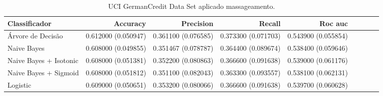 \begin{table}
\centering
\caption{UCI GermanCredit Data Set aplicado massageamento.}
\label{Aplicado massageamento 1}
\begin{tabular}{lrrrrrrrl}
\toprule
Classificador            &         Accuracy       &        Precision       &  Recall              &  Roc auc  \\
\midrule
Árvore de Decisão        &   0.612000 (0.050947) & 0.361100 (0.076585) &  0.373300 (0.071703) &  0.543900 (0.055854) \\ 
Naive Bayes              &   0.608000 (0.049855) & 0.351467 (0.078787) &  0.364400 (0.089674) &  0.538400 (0.059646) \\ 
Naive Bayes + Isotonic   &   0.608000 (0.051381) & 0.352200 (0.080863) &  0.366600 (0.091638) &  0.539000 (0.061176) \\ 
Naive Bayes + Sigmoid    &   0.608000 (0.051812) & 0.351100 (0.082043) &  0.363300 (0.093557) &  0.538100 (0.062131) \\ 
Logistic                 &   0.609000 (0.050651) & 0.353200 (0.080066) &  0.366600 (0.091638) &  0.539700 (0.060628) \\  
\bottomrule
\end{tabular}
\end{table}
